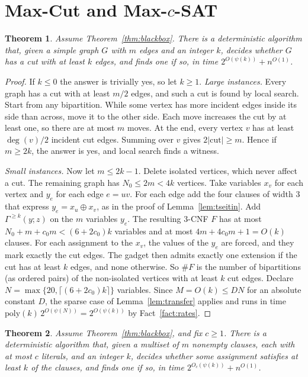 \documentclass[11pt]{amsart}
\newtheorem{theorem}{Theorem}[section]
\theoremstyle{definition}
\theoremstyle{remark}
\newcommand{\poly}{\mathrm{poly}}
\begin{document}
\section{Max-Cut and Max-\texorpdfstring{$c$}{c}-SAT}

\begin{theorem}\label{thm:maxcut}
Assume Theorem~\ref{thm:blackbox}. There is a deterministic algorithm that, given a simple graph $G$ with $m$ edges and an integer $k$, decides whether $G$ has a cut with at least $k$ edges, and finds one if so, in time $2^{O(\psi(k))}+n^{O(1)}$.
\end{theorem}

\begin{proof}
If $k\le0$ the answer is trivially yes, so let $k\ge1$. \emph{Large instances.} Every graph has a cut with at least $m/2$ edges, and such a cut is found by local search. Start from any bipartition. While some vertex has more incident edges inside its side than across, move it to the other side. Each move increases the cut by at least one, so there are at most $m$ moves. At the end, every vertex $v$ has at least $\deg(v)/2$ incident cut edges. Summing over $v$ gives $2|\mathrm{cut}|\ge m$. Hence if $m\ge 2k$, the answer is yes, and local search finds a witness.

\emph{Small instances.} Now let $m\le 2k-1$. Delete isolated vertices, which never affect a cut. The remaining graph has $N_0\le 2m<4k$ vertices. Take variables $x_v$ for each vertex and $y_e$ for each edge $e=uv$. For each edge add the four clauses of width 3 that express $y_e=x_u\oplus x_v$, as in the proof of Lemma~\ref{lem:tseitin}. Add $\Gamma^{\ge k}(y;z)$ on the $m$ variables $y_e$. The resulting $3$-CNF $F$ has at most $N_0+m+c_0m<(6+2c_0)k$ variables and at most $4m+4c_0m+1=O(k)$ clauses. For each assignment to the $x_v$, the values of the $y_e$ are forced, and they mark exactly the cut edges. The gadget then admits exactly one extension if the cut has at least $k$ edges, and none otherwise. So $\#F$ is the number of bipartitions (as ordered pairs) of the non-isolated vertices with at least $k$ cut edges. Declare $N=\max\{20,\lceil(6+2c_0)k\rceil\}$ variables. Since $M=O(k)\le DN$ for an absolute constant $D$, the sparse case of Lemma~\ref{lem:transfer} applies and runs in time $\poly(k)\,2^{O(\psi(N))}=2^{O(\psi(k))}$ by Fact~\ref{fact:rates}.
\end{proof}

\begin{theorem}\label{thm:maxsat}
Assume Theorem~\ref{thm:blackbox}, and fix $c\ge1$. There is a deterministic algorithm that, given a multiset of $m$ nonempty clauses, each with at most $c$ literals, and an integer $k$, decides whether some assignment satisfies at least $k$ of the clauses, and finds one if so, in time $2^{O_c(\psi(k))}+n^{O(1)}$.
\end{theorem}
\end{document}
